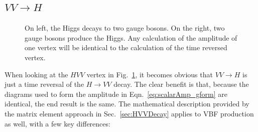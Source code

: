 \subsection{$VV \rightarrow H$}
\label{sec:VBFVertex}

\begin{figure}[htbp]
\begin{center}
\unitlength=1mm
\caption[Feynman Diagrams of the HVV vertex]{On left, the Higgs decays to two gauge bosons. On the right, two gauge bosons produce the Higgs. Any calculation of the amplitude of one vertex will be identical to the calculation of the time reversed vertex.}
\label{fig:HVVVertex}
\end{center}
\end{figure}

When looking at the $HVV$ vertex in Fig.~\ref{fig:HVVVertex}, it becomes obvious that $VV\rightarrow H$ is just a time reversal of the $H\rightarrow VV$ decay. The clear benefit is that, because the diagrams used to form the amplitude in Eqn.~\ref{eq:scalarAmp_gform} are identical, the end result is the same. The mathematical description provided by the matrix element approach in Sec.~\ref{sec:HVVDecay} applies to VBF production as well, with a few key differences:

